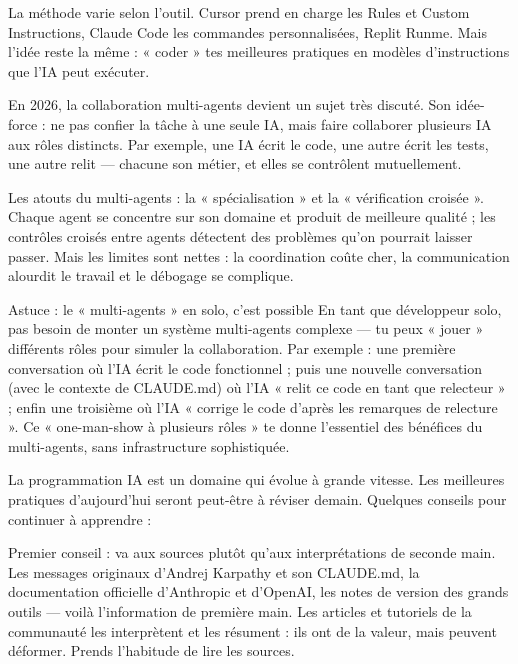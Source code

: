 La méthode varie selon l'outil. Cursor prend en charge les Rules et Custom Instructions, Claude Code les commandes personnalisées, Replit Runme. Mais l'idée reste la même : « coder » tes meilleures pratiques en modèles d'instructions que l'IA peut exécuter.


En 2026, la collaboration multi-agents devient un sujet très discuté. Son idée-force : ne pas confier la tâche à une seule IA, mais faire collaborer plusieurs IA aux rôles distincts. Par exemple, une IA écrit le code, une autre écrit les tests, une autre relit — chacune son métier, et elles se contrôlent mutuellement.

Les atouts du multi-agents : la « spécialisation » et la « vérification croisée ». Chaque agent se concentre sur son domaine et produit de meilleure qualité ; les contrôles croisés entre agents détectent des problèmes qu'on pourrait laisser passer. Mais les limites sont nettes : la coordination coûte cher, la communication alourdit le travail et le débogage se complique.

\begin{tcbinfo}{Astuce : le « multi-agents » en solo, c'est possible}
En tant que développeur solo, pas besoin de monter un système multi-agents complexe — tu peux « jouer » différents rôles pour simuler la collaboration. Par exemple : une première conversation où l'IA écrit le code fonctionnel ; puis une nouvelle conversation (avec le contexte de CLAUDE.md) où l'IA « relit ce code en tant que relecteur » ; enfin une troisième où l'IA « corrige le code d'après les remarques de relecture ». Ce « one-man-show à plusieurs rôles » te donne l'essentiel des bénéfices du multi-agents, sans infrastructure sophistiquée.

\end{tcbinfo}


La programmation IA est un domaine qui évolue à grande vitesse. Les meilleures pratiques d'aujourd'hui seront peut-être à réviser demain. Quelques conseils pour continuer à apprendre :

Premier conseil : va aux sources plutôt qu'aux interprétations de seconde main. Les messages originaux d'Andrej Karpathy et son CLAUDE.md, la documentation officielle d'Anthropic et d'OpenAI, les notes de version des grands outils — voilà l'information de première main. Les articles et tutoriels de la communauté les interprètent et les résument : ils ont de la valeur, mais peuvent déformer. Prends l'habitude de lire les sources.

